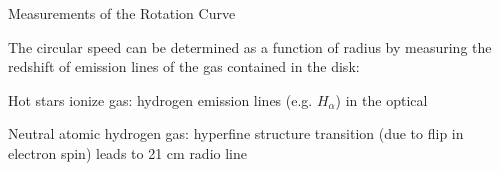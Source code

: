 \documentclass[letterpaper,landscape]{slides}
\begin{document}

\begin{slide}
\begin{center}
{\large \color{red} 
           Measurements of the Rotation Curve}
\end{center}


The circular speed can be determined as a function of radius
by measuring the redshift of emission lines of the gas contained
in the disk:

{\color{blue} Hot stars ionize gas:} hydrogen emission lines (e.g. $H_\alpha$) in
the optical

{\color{blue} Neutral atomic hydrogen gas}: hyperfine structure transition
(due to flip in electron spin) leads to 21 cm radio line




\vfill
\end{slide}


\end{document}
